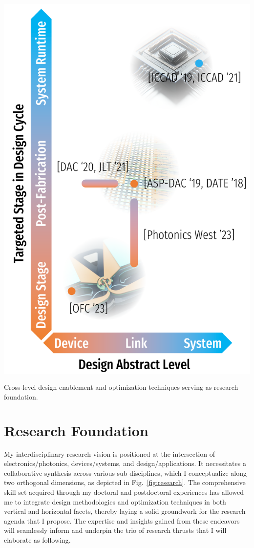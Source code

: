 \begin{marginfigure}%
    \includegraphics[width=\linewidth]{../../fig/research.pdf}
    \caption{Cross-level design enablement and optimization techniques serving as research foundation.}
    \label{fig:research}
\end{marginfigure}
\section{Research Foundation}

My interdisciplinary research vision is positioned at the intersection of electronics/photonics, devices/systems, and design/applications. It necessitates a collaborative synthesis across various sub-disciplines, which I conceptualize along two orthogonal dimensions, as depicted in Fig.~\ref{fig:research}. The comprehensive skill set acquired through my doctoral and postdoctoral experiences has allowed me to integrate design methodologies and optimization techniques in both vertical and horizontal facets, thereby laying a solid groundwork for the research agenda that I propose. The expertise and insights gained from these endeavors will seamlessly inform and underpin the trio of research thrusts that I will elaborate as following.

